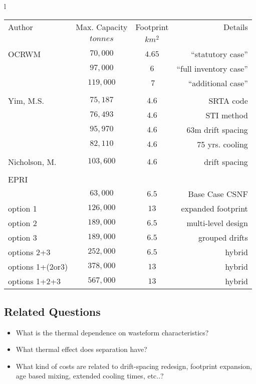 \begin{centering}
\begin{tabular}{l}
\\
\begin{tabular}{l|c|c|r}
Author&Max. Capacity&Footprint&Details\\
&$tonnes$&$km^2$&\\
\hline
&&&\\
OCRWM&$70,000$&$4.65$&``statutory case''\\
&$97,000$&$6$&``full inventory case''\\
&$119,000$&$~7$&``additional case''\\
\hline
&&&\\
Yim, M.S.&$75,187$&$4.6$&SRTA code\\
&$76,493$&$4.6$&STI method\\
&$95,970$&$4.6$&$63$m drift spacing\\
&$82,110$&$4.6$&75 yrs. cooling\\
\hline
&&&\\
Nicholson, M.&$103,600$&$4.6$&drift spacing\\
\hline
&&&\\
EPRI&&&\\
&$63,000$&$6.5$&Base Case CSNF\\
option 1&$126,000$&$13$&expanded footprint\\
option 2&$189,000$&$6.5$&multi-level design\\
option 3&$189,000$&$6.5$&grouped drifts\\
options 2+3&$252,000$&$6.5$&hybrid\\
options 1+(2or3) &$378,000$&$13$&hybrid\\
options 1+2+3 &$567,000$&$13$&hybrid\\
\hline

\end{tabular}
\end{tabular}
\end{centering}

\subsection{Related Questions}
\begin{itemize}
\item{} What is the thermal dependence on wasteform characteristics?
\item{} What thermal effect does separation have?
\item{} What kind of costs are related to drift-spacing redesign, footprint expansion, age based mixing, extended cooling times, etc..? 
\end{itemize}
